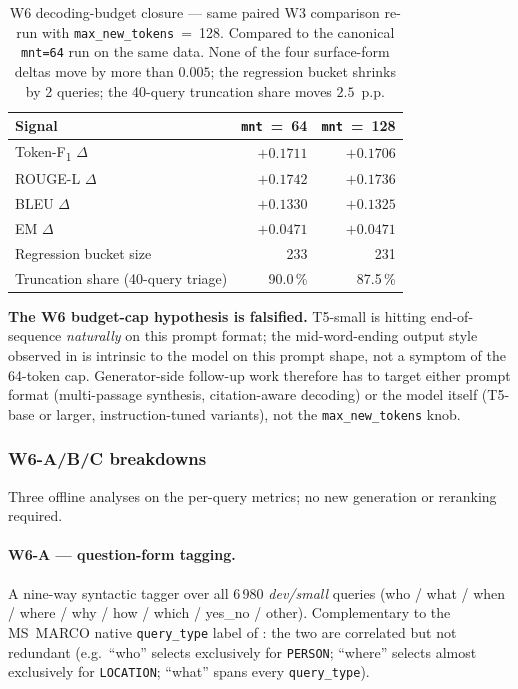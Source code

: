 \documentclass[11pt,a4paper]{article}
\newcommand{\devsmall}{\textit{dev/small}}
\newcommand{\fdev}{6\,980}
\newcommand{\msmarco}{MS~MARCO}
\newcommand{\F}{F\textsubscript{1}}
\newcommand{\Tokenf}{Token-\F}
\newcommand{\rougel}{ROUGE-L}
\begin{document}
\begin{table}[H]
  \centering
  \caption{W6 decoding-budget closure --- same paired W3 comparison
  re-run with \texttt{max\_new\_tokens}~=~128.  Compared to the
  canonical \texttt{mnt=64} run on the same data.  None of the four
  surface-form deltas move by more than $0.005$; the regression
  bucket shrinks by 2 queries; the 40-query truncation share moves
  $2.5$~p.p.}
  \label{tab:w6-closure}
  \begin{tabular}{lrr}
    \toprule
    Signal                              & \texttt{mnt}~=~64 & \texttt{mnt}~=~128 \\
    \midrule
    \Tokenf{} $\Delta$                  & $+0.1711$ & $+0.1706$ \\
    \rougel{} $\Delta$                  & $+0.1742$ & $+0.1736$ \\
    BLEU $\Delta$                       & $+0.1330$ & $+0.1325$ \\
    EM $\Delta$                         & $+0.0471$ & $+0.0471$ \\
    Regression bucket size              & 233       & 231       \\
    Truncation share (40-query triage)  & 90.0\,\%  & 87.5\,\%  \\
    \bottomrule
  \end{tabular}
\end{table}

\textbf{The W6 budget-cap hypothesis is falsified.}  T5-small is
hitting end-of-sequence \emph{naturally} on this prompt format;
the mid-word-ending output style observed in
 is intrinsic to the model on this prompt
shape, not a symptom of the 64-token cap.  Generator-side follow-up
work therefore has to target either prompt format (multi-passage
synthesis, citation-aware decoding) or the model itself
(T5-base or larger, instruction-tuned variants), not the
\texttt{max\_new\_tokens} knob.

\subsubsection{W6-A/B/C breakdowns}
\label{sec:w6-followups}

Three offline analyses on the per-query metrics; no new generation
or reranking required.

\paragraph{W6-A --- question-form tagging.}  A nine-way syntactic
tagger over all \fdev{} \devsmall{} queries (who / what / when /
where / why / how / which / yes\_no / other).  Complementary to the
\msmarco{} native \texttt{query\_type} label of
: the two are correlated but not
redundant (e.g.\ ``who'' selects exclusively for \texttt{PERSON};
``where'' selects almost exclusively for \texttt{LOCATION}; ``what''
spans every \texttt{query\_type}).
\end{document}
